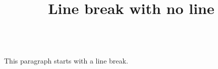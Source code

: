 \documentclass{handout}
\title{Line break with no line}
\begin{document}
\maketitle

\\ This paragraph starts with a line break.
\end{document}
